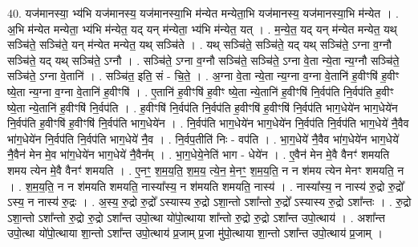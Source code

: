 \documentclass[17pt]{extarticle}
\begin{document}
40. यज॑मानस्या॒ भ्य॑भि यज॑मानस्य॒ यज॑मानस्या॒भि म॑न्येत मन्येता॒भि यज॑मानस्य॒ यज॑मानस्या॒भि म॑न्येत । . अ॒भि म॑न्येत मन्येता॒ भ्य॑भि म॑न्येत॒ यद् यन् म॑न्येता॒ भ्य॑भि म॑न्येत॒ यत् । . म॒न्ये॒त॒ यद् यन् म॑न्येत मन्येत॒ यथ् सञ्चि॑ते॒ सञ्चि॑ते॒ यन् म॑न्येत मन्येत॒ यथ् सञ्चि॑ते । . यथ् सञ्चि॑ते॒ सञ्चि॑ते॒ यद् यथ् सञ्चि॑ते॒ ऽग्ना व॒ग्नौ सञ्चि॑ते॒ यद् यथ् सञ्चि॑ते॒ ऽग्नौ । . सञ्चि॑ते॒ ऽग्ना व॒ग्नौ सञ्चि॑ते॒ सञ्चि॑ते॒ ऽग्ना वे॒ता न्ये॒ता न्य॒ग्नौ सञ्चि॑ते॒ सञ्चि॑ते॒ ऽग्ना वे॒तानि॑ । . सञ्चि॑त॒ इति॒ सं - चि॒ते॒ । . अ॒ग्ना वे॒ता न्ये॒ता न्य॒ग्ना व॒ग्ना वे॒तानि॑ ह॒वीꣳषि॑ ह॒वीꣳ ष्ये॒ता न्य॒ग्ना व॒ग्ना वे॒तानि॑ ह॒वीꣳषि॑ । . ए॒तानि॑ ह॒वीꣳषि॑ ह॒वीꣳ ष्ये॒ता न्ये॒तानि॑ ह॒वीꣳषि॑ नि॒र्वप॑ति नि॒र्वप॑ति ह॒वीꣳ ष्ये॒ता न्ये॒तानि॑ ह॒वीꣳषि॑ नि॒र्वप॑ति । . ह॒वीꣳषि॑ नि॒र्वप॑ति नि॒र्वप॑ति ह॒वीꣳषि॑ ह॒वीꣳषि॑ नि॒र्वप॑ति भाग॒धेये॑न भाग॒धेये॑न नि॒र्वप॑ति ह॒वीꣳषि॑ ह॒वीꣳषि॑ नि॒र्वप॑ति भाग॒धेये॑न । . नि॒र्वप॑ति भाग॒धेये॑न भाग॒धेये॑न नि॒र्वप॑ति नि॒र्वप॑ति भाग॒धेये॑ नै॒वैव भा॑ग॒धेये॑न नि॒र्वप॑ति नि॒र्वप॑ति भाग॒धेये॑ नै॒व । . नि॒र्वप॒तीति॑ निः - वप॑ति । . भा॒ग॒धेये॑ नै॒वैव भा॑ग॒धेये॑न भाग॒धेये॑ नै॒वैन॑ मेन मे॒व भा॑ग॒धेये॑न भाग॒धेये॑ नै॒वैन᳚म् । . भा॒ग॒धेये॒नेति॑ भाग - धेये॑न । . ए॒वैन॑ मेन मे॒वै वैनꣳ॑ शमयति शमय त्येन मे॒वै वैनꣳ॑ शमयति । . ए॒नꣳ॒॒ श॒म॒य॒ति॒ श॒म॒य॒ त्ये॒न॒ मे॒नꣳ॒॒ श॒म॒य॒ति॒ न न श॑मय त्येन मेनꣳ शमयति॒ न । . श॒म॒य॒ति॒ न न श॑मयति शमयति॒ नास्या᳚स्य॒ न श॑मयति शमयति॒ नास्य॑ । . नास्या᳚स्य॒ न नास्य॑ रु॒द्रो रु॒द्रो᳚ ऽस्य॒ न नास्य॑ रु॒द्रः । . अ॒स्य॒ रु॒द्रो रु॒द्रो᳚ ऽस्यास्य रु॒द्रो ऽशा॒न्तो ऽशा᳚न्तो रु॒द्रो᳚ ऽस्यास्य रु॒द्रो ऽशा᳚न्तः । . रु॒द्रो ऽशा॒न्तो ऽशा᳚न्तो रु॒द्रो रु॒द्रो ऽशा᳚न्त उपो॒त्था यो॑पो॒त्थाया शा᳚न्तो रु॒द्रो रु॒द्रो ऽशा᳚न्त उपो॒त्थाय॑ । . अशा᳚न्त उपो॒त्था यो॑पो॒त्थाया शा॒न्तो ऽशा᳚न्त उपो॒त्थाय॑ प्र॒जाम् प्र॒जा मु॑पो॒त्थाया शा॒न्तो ऽशा᳚न्त उपो॒त्थाय॑ प्र॒जाम् । \newline
\pagebreak
{}
\end{document}
